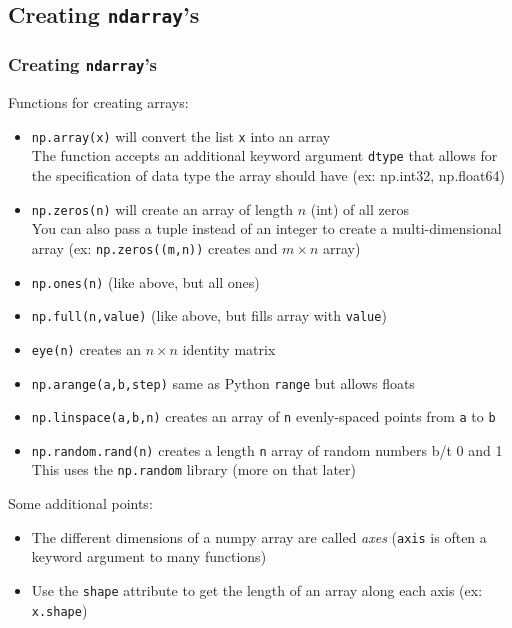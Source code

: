\documentclass{beamer}
\newcommand{\code}[1]{\texttt{#1}}
\begin{document}
\subsection{Creating \code{ndarray}'s}

\begin{frame}	
	\frametitle{Creating \code{ndarray}'s}
	
	\begin{block}{Functions for creating arrays:}
		\begin{scriptsize}
		
		\begin{itemize}
			\item \code{np.array(x)} will convert the list \code{x} into an array \\
					The function accepts an additional keyword argument \code{dtype} that allows for the specification of data type the array should have (ex: np.int32, np.float64)
			\item \code{np.zeros(n)} will create an array of length $n$ (int) of all zeros \\
					You can also pass a tuple instead of an integer to create a multi-dimensional array (ex: \code{np.zeros((m,n))} creates and $m\times n$ array)
			\item \code{np.ones(n)} (like above, but all ones)
			\item \code{np.full(n,value)} (like above, but fills array with \code{value})
			\item \code{eye(n)} creates an $n\times n$ identity matrix
			\item \code{np.arange(a,b,step)} same as Python \code{range} but allows floats
			\item \code{np.linspace(a,b,n)} creates an array of \code{n} evenly-spaced points from \code{a} to \code{b}
			\item \code{np.random.rand(n)} creates a length \code{n} array of random numbers b/t 0 and 1 \\
					This uses the \code{np.random} library (more on that later)
		\end{itemize}
		Some additional points:
		\begin{itemize}
			\item The different dimensions of a numpy array are called \emph{axes} (\code{axis} is often a keyword argument to many functions)
			\item Use the \code{shape} attribute to get the length of an array along each axis (ex: \code{x.shape})
		\end{itemize}
		
		\end{scriptsize}
	\end{block}
	
\end{frame}
\end{document}
